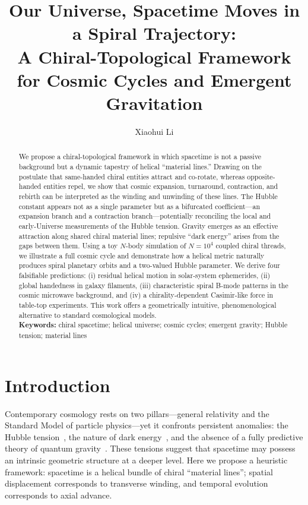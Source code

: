 \documentclass[12pt,a4paper]{article}
\title{\textbf{Our Universe, Spacetime Moves in a Spiral Trajectory:}\\[0.2em]
\large A Chiral-Topological Framework for Cosmic Cycles and Emergent Gravitation}
\author[1]{Xiaohui Li}
\affil[1]{Independent Researcher, Baoji 721000, China}
\affil[ ]{\textit{Correspondence: Xiaohui Li (email: danceluck@163.com)}}
\affil[ ]{\textit{ORCID: 0009-0003-8233-7191}}
\affil[ ]{\textit{Data homepage: \url{https://github.com/xiaohui-li-lab/}}}
\date{}
\begin{document}
\maketitle

\begin{abstract}
\noindent
We propose a chiral-topological framework in which spacetime is not a passive background but a dynamic tapestry of helical ``material lines.'' Drawing on the postulate that same-handed chiral entities attract and co-rotate, whereas opposite-handed entities repel, we show that cosmic expansion, turnaround, contraction, and rebirth can be interpreted as the winding and unwinding of these lines. The Hubble constant appears not as a single parameter but as a bifurcated coefficient---an expansion branch and a contraction branch---potentially reconciling the local and early-Universe measurements of the Hubble tension. Gravity emerges as an effective attraction along shared chiral material lines; repulsive ``dark energy'' arises from the gaps between them. Using a toy $N$-body simulation of $N=10^4$ coupled chiral threads, we illustrate a full cosmic cycle and demonstrate how a helical metric naturally produces spiral planetary orbits and a two-valued Hubble parameter. We derive four falsifiable predictions: (i) residual helical motion in solar-system ephemerides, (ii) global handedness in galaxy filaments, (iii) characteristic spiral B-mode patterns in the cosmic microwave background, and (iv) a chirality-dependent Casimir-like force in table-top experiments. This work offers a geometrically intuitive, phenomenological alternative to standard cosmological models.
\\[0.8em]
\noindent\textbf{Keywords:} chiral spacetime; helical universe; cosmic cycles; emergent gravity; Hubble tension; material lines
\end{abstract}

\section*{Introduction}

Contemporary cosmology rests on two pillars---general relativity and the Standard Model of particle physics---yet it confronts persistent anomalies: the Hubble tension~\cite{riess2016,planck2020}, the nature of dark energy~\cite{zeldovich1968}, and the absence of a fully predictive theory of quantum gravity~\cite{ambjorn2012}. These tensions suggest that spacetime may possess an intrinsic geometric structure at a deeper level. Here we propose a heuristic framework: spacetime is a helical bundle of chiral ``material lines''; spatial displacement corresponds to transverse winding, and temporal evolution corresponds to axial advance.
\end{document}
